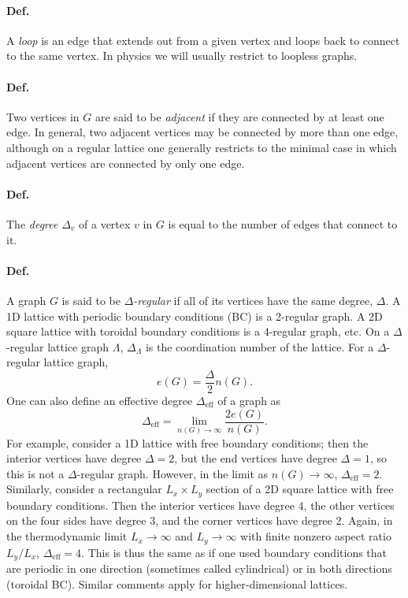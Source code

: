 \paragraph{Def.} A \emph{loop} is an edge that extends out from a given vertex and loops back to connect to the same vertex.
In physics we will usually restrict to loopless graphs.

\paragraph{Def.} Two vertices in $G$ are said to be \emph{adjacent} if they are connected by at least one edge. In general,
two adjacent vertices may be connected by more than one edge, although on a regular lattice one generally restricts to the
minimal case in which adjacent vertices are connected by only one edge.

\paragraph{Def.} The \emph{degree} $\Delta_v$ of a vertex $v$ in $G$ is equal to the number of edges that connect to it.

\paragraph{Def.} A graph $G$ is said to be \emph{$\Delta$-regular} if all of its vertices have the same degree, $\Delta$. A 1D
lattice with periodic boundary conditions (BC) is a 2-regular graph. A 2D square lattice with toroidal boundary conditions
is a 4-regular graph, etc. On a $\Delta$-regular lattice graph $\Lambda$, $\Delta_\Lambda$ is the coordination number of the
lattice. For a $\Delta$-regular lattice graph,
\begin{equation}
  e(G) = \frac{\Delta}{2}n(G).
\end{equation}
One can also define an effective degree $\Delta_{\text{eff}}$ of a graph as
\begin{equation}
  \Delta_{\text{eff}} = \lim_{n(G)\to\infty}\frac{2e(G)}{n(G)}.
\end{equation}
For example, consider a 1D lattice with free boundary conditions; then the interior vertices have degree $\Delta = 2$, but
the end vertices have degree $\Delta = 1$, so this is not a $\Delta$-regular graph. However, in the limit as
$n(G)\to\infty$, $\Delta_{\text{eff}} = 2$. Similarly, consider a rectangular $L_x\times L_y$ section of a 2D square lattice
with free boundary conditions. Then the interior vertices have degree 4, the other vertices on the four sides have degree 3,
and the corner vertices have degree 2. Again, in the thermodynamic limit $L_x\to\infty$ and $L_y\to\infty$ with finite
nonzero aspect ratio $L_y/L_x$, $\Delta_{\text{eff}} = 4$. This is thus the same as if one used boundary conditions that are
periodic in one direction (sometimes called cylindrical) or in both directions (toroidal BC). Similar comments apply for
higher-dimensional lattices.

